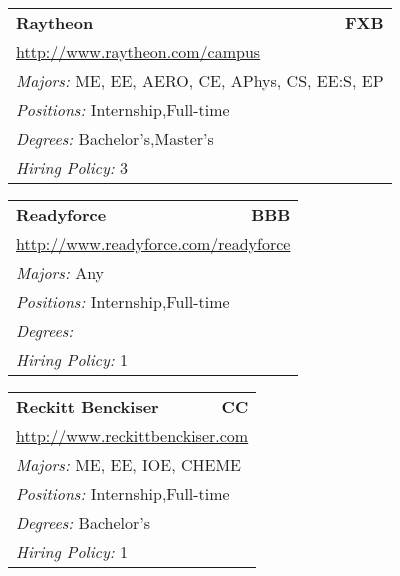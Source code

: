 \documentclass[twoside]{article}
\begin{document}
\begin{center}
\begin{multicols}{3}
\begin{FlushLeft}
\begin{minipage}{\columnwidth}
\end{minipage}
 
\begin{minipage}{\columnwidth}\begin{tabularx}{.95\columnwidth}{Xr}
                 {\Large\bf Raytheon} & {\Large\bf FXB}\\
    \multicolumn{2}{p{.95\columnwidth}}{\url{http://www.raytheon.com/campus}}\\
    \multicolumn{2}{p{.95\columnwidth}}{\emph{Majors:} ME, EE, AERO, CE, APhys, CS, EE:S, EP}\\
    \multicolumn{2}{p{.95\columnwidth}}{\emph{Positions:} Internship,Full-time}\\
    \multicolumn{2}{p{.95\columnwidth}}{\emph{Degrees:} Bachelor's,Master's}\\
    \multicolumn{2}{p{.95\columnwidth}}{\emph{Hiring Policy:} 3}\\
    \end{tabularx}
    
\end{minipage}
 
\begin{minipage}{\columnwidth}\begin{tabularx}{.95\columnwidth}{Xr}
                 {\Large\bf Readyforce} & {\Large\bf BBB}\\
    \multicolumn{2}{p{.95\columnwidth}}{\url{http://www.readyforce.com/readyforce}}\\
    \multicolumn{2}{p{.95\columnwidth}}{\emph{Majors:} Any}\\
    \multicolumn{2}{p{.95\columnwidth}}{\emph{Positions:} Internship,Full-time}\\
    \multicolumn{2}{p{.95\columnwidth}}{\emph{Degrees:} }\\
    \multicolumn{2}{p{.95\columnwidth}}{\emph{Hiring Policy:} 1}\\
    \end{tabularx}
    
\end{minipage}
 
\begin{minipage}{\columnwidth}\begin{tabularx}{.95\columnwidth}{Xr}
                 {\Large\bf Reckitt Benckiser} & {\Large\bf CC}\\
    \multicolumn{2}{p{.95\columnwidth}}{\url{http://www.reckittbenckiser.com}}\\
    \multicolumn{2}{p{.95\columnwidth}}{\emph{Majors:} ME, EE, IOE, CHEME}\\
    \multicolumn{2}{p{.95\columnwidth}}{\emph{Positions:} Internship,Full-time}\\
    \multicolumn{2}{p{.95\columnwidth}}{\emph{Degrees:} Bachelor's}\\
    \multicolumn{2}{p{.95\columnwidth}}{\emph{Hiring Policy:} 1}\\
    \end{tabularx}
    

\end{minipage}
\end{FlushLeft}
\end{multicols}
\end{center}
\end{document}
